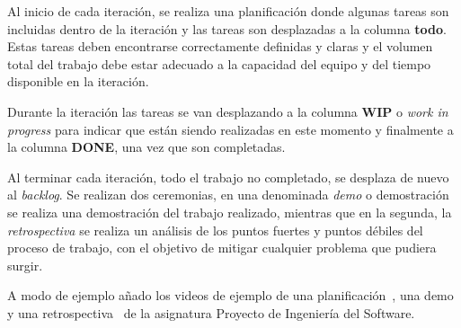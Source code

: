 Al inicio de cada iteración, se realiza una planificación donde algunas tareas son incluidas dentro de la iteración
y las tareas son desplazadas a la columna \textbf{todo}.
Estas tareas deben encontrarse correctamente definidas y claras y el volumen total del trabajo debe estar adecuado a
la capacidad del equipo y del tiempo disponible en la iteración.

Durante la iteración las tareas se van desplazando a la columna \textbf{WIP} o \textit{work in progress} para
indicar que están siendo realizadas en este momento y finalmente a la columna \textbf{DONE}, una vez que son
completadas.

Al terminar cada iteración, todo el trabajo no completado, se desplaza de nuevo al \textit{backlog}.
Se realizan dos ceremonias, en una denominada \textit{demo} o demostración se realiza una demostración del trabajo
realizado, mientras que en la segunda, la \textit{retrospectiva} se realiza un análisis de los puntos fuertes y
puntos débiles del proceso de trabajo, con el objetivo de mitigar cualquier problema que pudiera surgir.

A modo de ejemplo añado los videos de ejemplo de una planificación~\cite{url_viu_47_proyecto_ingenieria_sprint_6_plan},
una demo~\cite{url_viu_47_proyecto_ingenieria_sprint_6_demo} y una
retrospectiva~\cite{url_viu_47_proyecto_ingenieria_sprint_6_retrospectiva} de la asignatura Proyecto de Ingeniería del
Software.